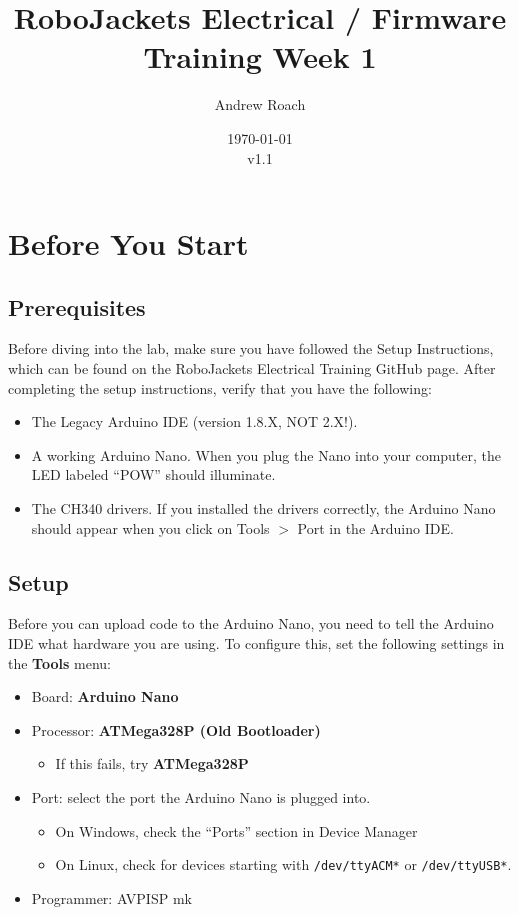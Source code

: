 \documentclass{article}
\title{RoboJackets Electrical / Firmware Training Week 1}
\author{Andrew Roach}
\date{\today\\v1.1}
\begin{document}
\maketitle{}
\setcounter{tocdepth}{2}
\tableofcontents
\pagebreak



\section{Before You Start}

\subsection{Prerequisites}

Before diving into the lab, make sure you have followed the Setup Instructions, which can be found on the RoboJackets Electrical Training GitHub page. After completing the setup instructions, verify that you have the following:

\begin{itemize}
    \item The Legacy Arduino IDE (version 1.8.X, NOT 2.X!).
    \item A working Arduino Nano. When you plug the Nano into your computer, the LED labeled ``POW'' should illuminate.
    \item The CH340 drivers. If you installed the drivers correctly, the Arduino Nano should appear when you click on Tools $>$ Port in the Arduino IDE.
\end{itemize}

\subsection{Setup}

Before you can upload code to the Arduino Nano, you need to tell the Arduino IDE what hardware you are using. To configure this, set the following settings in the {\bf Tools} menu:

\begin{itemize}
    \item Board: {\bf Arduino Nano}
    \item Processor: {\bf ATMega328P (Old Bootloader)}
    \begin{itemize}
        \item If this fails, try {\bf ATMega328P} 
    \end{itemize}
    \item Port: select the port the Arduino Nano is plugged into.
    \begin{itemize}
        \item On Windows, check the ``Ports'' section in Device Manager
        \item On Linux, check for devices starting with \verb|/dev/ttyACM*| or \verb|/dev/ttyUSB*|.
    \end{itemize}
    \item Programmer: AVPISP mk
\end{itemize}
\end{document}
